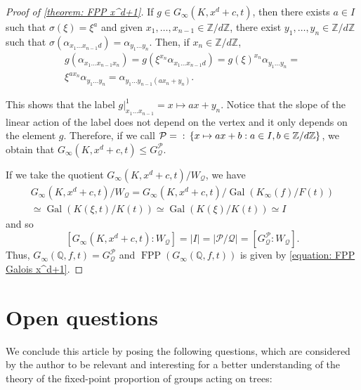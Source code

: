 \documentclass{amsart}
\def\set#1{{\def\st{\;:\;}\left\{#1\right\}}}
\def\abs#1{\left\vert{#1}\right\vert}
\def\ZZ{\mathbb Z}
\def\QQ{\mathbb Q}
\DeclareMathOperator{\Gal}{Gal}
\DeclareMathOperator{\FPP}{FPP}
\DeclareMathOperator{\st}{st}
\begin{document}
\begin{proof}[Proof of \cref{theorem: FPP x^d+1}]
If $g \in G_\infty(K,x^d+c,t)$, then there exists $a \in I$ such that $\sigma(\xi) = \xi^a$ and given $x_1,\dots, x_{n-1} \in \ZZ/d\ZZ$, there exist $y_1,\dots, y_n \in \ZZ/d\ZZ$ such that $\sigma(\alpha_{x_1 \dots x_{n-1}d}) = \alpha_{y_1 \dots y_n}$. Then, if $x_n \in \ZZ/d\ZZ$,
\begin{align*}
g(\alpha_{x_1 \dots x_{n-1}x_n}) = g(\xi^{x_n} \alpha_{x_1 \dots x_{n-1}d}) = g(\xi)^{x_n} \alpha_{y_1 \dots y_n} = \\ \xi^{a x_n} \alpha_{y_1 \dots y_n} = \alpha_{y_1 \dots y_{n-1}(ax_n + y_n)}.
\end{align*}

This shows that the label $g|_{x_1 \dots x_{n-1}}^1 = x \mapsto ax + y_n$. Notice that the slope of the linear action of the label does not depend on the vertex and it only depends on the element $g$. Therefore, if we call $\mathcal{P} = \set{x \mapsto ax+b: a \in I, b \in \ZZ/d\ZZ}$, we obtain that $G_\infty(K,x^d+c,t) \leq G_\mathcal{Q}^\mathcal{P}$. 

If we take the quotient $G_\infty(K, x^d+c,t)/W_\mathcal{Q}$, we have 
\begin{align*}
G_\infty(K, x^d+c,t)/W_\mathcal{Q} = G_\infty(K, x^d+c,t)/\Gal(K_\infty(f)/F(t)) \\ \simeq \Gal(K(\xi,t)/K(t)) \simeq \Gal(K(\xi)/K(t)) \simeq I
\end{align*}
and so $$[G_\infty(K, x^d+c,t):W_\mathcal{Q}] = \abs{I} = \abs{\mathcal{P}/\mathcal{Q}} = [G_\mathcal{Q}^\mathcal{P}: W_\mathcal{Q}].$$ 
Thus, $G_\infty(\QQ,f,t) = G_\mathcal{Q}^\mathcal{P}$ and $\FPP(G_\infty(\QQ,f,t))$ is given by \cref{equation: FPP Galois x^d+1}. 
\end{proof}


\section{Open questions}
\label{section: open questions}

We conclude this article by posing the following questions, which are considered by the author to be relevant and interesting for a better understanding of the theory of the fixed-point proportion of groups acting on trees:
\end{document}
